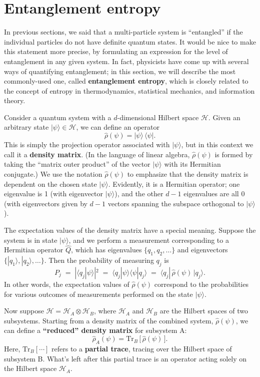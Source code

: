 \documentclass[pra,11pt]{revtex4}
\begin{document}
\section{Entanglement entropy}
\label{sec:entropy}

In previous sections, we said that a multi-particle system is
``entangled'' if the individual particles do not have definite quantum
states.  It would be nice to make this statement more precise, by
formulating an expression for the level of entanglement in any given
system.  In fact, physicists have come up with several ways of
quantifying entanglement; in this section, we will describe the most
commonly-used one, called \textbf{entanglement entropy}, which is
closely related to the concept of entropy in thermodynamics,
statistical mechanics, and information theory.

Consider a quantum system with a $d$-dimensional Hilbert space
$\mathscr{H}$.  Given an arbitrary state $|\psi\rangle \in
\mathscr{H}$, we can define an operator
$$\hat{\rho}(\psi) = |\psi\rangle\, \langle\psi|.$$
This is simply the projection operator associated with $|\psi\rangle$,
but in this context we call it a \textbf{density matrix}.  (In the
language of linear algebra, $\hat{\rho}(\psi)$ is formed by taking the
``matrix outer product'' of the vector $|\psi\rangle$ with its
Hermitian conjugate.)  We use the notation $\hat{\rho}(\psi)$ to
emphasize that the density matrix is dependent on the chosen state
$|\psi\rangle$.  Evidently, it is a Hermitian operator; one eigenvalue
is 1 (with eigenvector $|\psi\rangle$), and the other $d-1$
eigenvalues are all $0$ (with eigenvectors given by $d-1$ vectors
spanning the subspace orthogonal to $|\psi\rangle$).

The expectation values of the density matrix have a special meaning.
Suppose the system is in state $|\psi\rangle$, and we perform a
measurement corresponding to a Hermitian operator $\hat{Q}$, which has
eigenvalues $\{q_1,q_2,\dots\}$ and eigenvectors
$\{|q_1\rangle,|q_2\rangle,\dots\}$.  Then the probability of
measuring $q_j$ is
$$P_j \;=\; |\langle q_j| \psi\rangle|^2 \;=\; \langle q_j |\psi\rangle \langle \psi|q_j\rangle \;=\; \langle q_j |\, \hat{\rho}(\psi)\, |q_j \rangle.$$
In other words, the expectation values of $\hat{\rho}(\psi)$
correspond to the probabilities for various outcomes of measurements
performed on the state $|\psi\rangle$.

Now suppose $\mathscr{H} = \mathscr{H}_A \otimes \mathscr{H}_B$, where
$\mathscr{H}_A$ and $\mathscr{H}_B$ are the Hilbert spaces of two
subsystems.  Starting from a density matrix of the combined system,
$\hat{\rho}(\psi)$, we can define a \textbf{``reduced'' density
  matrix} for subsystem A:
$$\hat{\rho}_A(\psi) = \mathrm{Tr}_B \,\big[\,\hat{\rho}(\psi)\,\big].$$
Here, $\mathrm{Tr}_B[\cdots]$ refers to a \textbf{partial trace},
tracing over the Hilbert space of subsystem B.  What's left after
this partial trace is an operator acting solely on the Hilbert space
$\mathscr{H}_A$.
\end{document}
